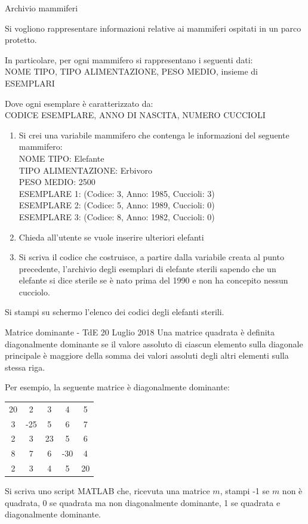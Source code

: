 \documentclass[aspectratio=169, ]{beamer}
\begin{document}
\begin{frame}[allowframebreaks]{Archivio mammiferi}

    Si vogliono rappresentare informazioni relative ai mammiferi ospitati in un
    parco protetto.

    In particolare, per ogni mammifero si rappresentano i seguenti dati:\\
    NOME TIPO, TIPO ALIMENTAZIONE, PESO MEDIO, insieme di ESEMPLARI

    Dove ogni esemplare è caratterizzato da:\\
    CODICE ESEMPLARE, ANNO DI NASCITA, NUMERO CUCCIOLI

    \begin{enumerate}
        \item Si crei una variabile mammifero che contenga le informazioni del
            seguente mammifero:\\
            NOME TIPO: Elefante\\
            TIPO ALIMENTAZIONE: Erbivoro\\
            PESO MEDIO: 2500\\
            ESEMPLARE 1: (Codice: 3, Anno: 1985, Cuccioli: 3)\\
            ESEMPLARE 2: (Codice: 5, Anno: 1989, Cuccioli: 0)\\
            ESEMPLARE 3: (Codice: 8, Anno: 1982, Cuccioli: 0)\\

        \item Chieda all'utente se vuole inserire ulteriori elefanti
        \item Si scriva il codice che costruisce, a partire dalla variabile creata al punto
            precedente, l'archivio degli esemplari di elefante sterili sapendo che un
            elefante si dice sterile se è nato prima del 1990 e non ha concepito
            nessun cucciolo.
    \end{enumerate}

    Si stampi su schermo l'elenco dei codici degli elefanti sterili.
\end{frame}

\begin{frame}{Matrice dominante - TdE 20 Luglio 2018}
Una matrice quadrata è definita diagonalmente dominante se il valore assoluto di ciascun elemento sulla
diagonale principale è maggiore della somma dei valori assoluti degli altri elementi sulla stessa riga.

Per esempio, la seguente matrice è diagonalmente dominante:
\begin{tabular}{ccccc}
	20 & 2 & 3 & 4 & 5 \\
	3 & -25 & 5 & 6 & 7 \\
	2 & 3 & 23 & 5 & 6 \\
	8 & 7 & 6 & -30 & 4 \\
	2 & 3 & 4 & 5 & 20 \\
\end{tabular}

Si scriva uno script MATLAB che, ricevuta una matrice $m$, stampi -1 se $m$ non è quadrata, 0 se quadrata ma non diagonalmente dominante, 1 se quadrata e diagonalmente dominante.
\end{frame}
\end{document}
